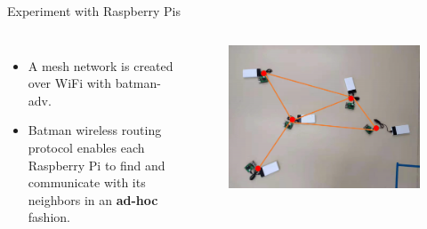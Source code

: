 \documentclass[10pt]{beamer}
\DeclareMathOperator{\1}{\textbf{1}}
\begin{document}
	      \begin{frame}{Experiment with Raspberry Pis}
		\begin{columns}[c]
		  \column{7cm}
		  \begin{itemize}
		    \item A mesh network is created over WiFi with batman-adv.
		    \item Batman wireless routing protocol enables each Raspberry Pi to find and communicate with its neighbors in an {\bf ad-hoc} fashion.
		  \end{itemize}
		  \column{5cm}
		  \begin{figure}
		    \centering
		    \includegraphics[width=1\textwidth]{pic/rpi_expriment.png}
		  \end{figure}
		\end{columns}
	      \end{frame}

\end{document}
